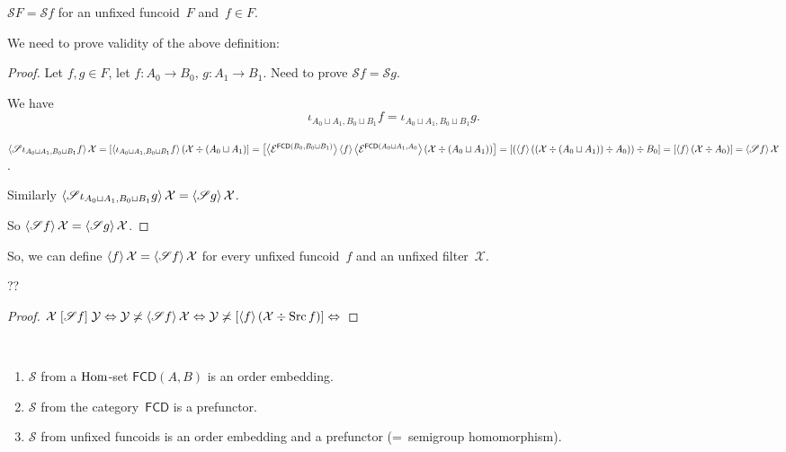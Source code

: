 \begin{defn}
$\mathscr{S}F=\mathscr{S}f$ for an unfixed funcoid~$F$
and~$f\in F$.
\end{defn}

We need to prove validity of the above definition:

\begin{proof}
Let $f,g\in F$, let $f:A_0\to B_0$, $g:A_1\to B_1$.
Need to prove $\mathscr{S}f=\mathscr{S}g$.

We have
\[\iota_{A_0\sqcup A_1,B_0\sqcup B_1}f=\iota_{A_0\sqcup A_1,B_0\sqcup B_1}g.\]

$\left\langle \mathscr{S}\iota_{A_0\sqcup A_1,B_0\sqcup B_1}f\right\rangle\mathcal{X}=
[\left\langle \iota_{A_0\sqcup A_1,B_0\sqcup B_1}f\right\rangle(\mathcal{X}\div(A_0\sqcup A_1)]=
\left[\left\langle \mathcal{E}^{\mathsf{FCD}(B_0,B_0\sqcup B_1)}\right\rangle\left\langle f\right\rangle\left\langle \mathcal{E}^{\mathsf{FCD}(A_0\sqcup A_1,A_0}\right\rangle(\mathcal{X}\div(A_0\sqcup A_1))\right]=
[(\left\langle f\right\rangle((\mathcal{X}\div(A_0\sqcup A_1))\div A_0))
\div B_0]=
[\left\langle f\right\rangle(\mathcal{X}\div A_0)]=
\left\langle \mathscr{S}f\right\rangle\mathcal{X}$.

Similarly
$\left\langle \mathscr{S}\iota_{A_0\sqcup A_1,B_0\sqcup B_1}g\right\rangle\mathcal{X}=
\left\langle \mathscr{S}g\right\rangle\mathcal{X}$.

So $\left\langle \mathscr{S}f\right\rangle\mathcal{X}=
\left\langle \mathscr{S}g\right\rangle\mathcal{X}$.
\end{proof}

\begin{defn}
So, we can define $\left\langle f\right\rangle\mathcal{X}=\left\langle \mathscr{S}f\right\rangle\mathcal{X}$ for every unfixed funcoid~$f$ and an unfixed filter~$\mathcal{X}$.
\end{defn}

\begin{prop}
??
\end{prop}

\begin{proof}
$\mathcal{X}\mathrel{\left[\mathscr{S}f\right]}\mathcal{Y}\Leftrightarrow
\mathcal{Y}\not\asymp\left\langle \mathscr{S}f\right\rangle\mathcal{X}
\Leftrightarrow
\mathcal{Y}\not\asymp [\left\langle f\right\rangle(\mathcal{X}\div\operatorname{Src} f)]
\Leftrightarrow$
\end{proof}

\begin{prop}\label{s-fcd}
~
\begin{enumerate}
\item\label{s-fcd-hom} $\mathscr{S}$ from a $\operatorname{Hom}$-set $\mathsf{FCD}(A,B)$
is an order embedding.
\item\label{s-fcd-fctr} $\mathscr{S}$ from the category~$\mathsf{FCD}$
is a prefunctor.
\item\label{s-fcd-unfix} $\mathscr{S}$ from unfixed funcoids is an order embedding and a prefunctor (=~semigroup homomorphism).
\end{enumerate}
\end{prop}


